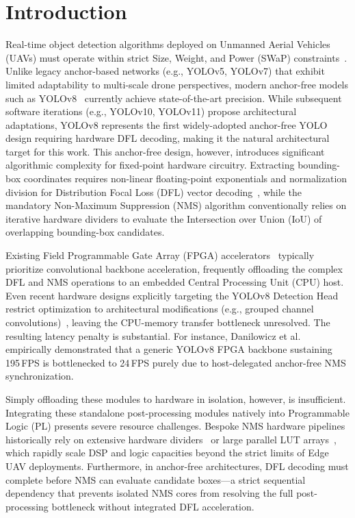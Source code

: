 \documentclass{svproc}
\begin{document}
\section{Introduction}
\label{sec:intro}

Real-time object detection algorithms deployed on Unmanned Aerial Vehicles (UAVs) must operate within strict Size, Weight, and Power (SWaP) constraints~\cite{yolo_uav2023,chakrabarty2025kiitmita,personnel_sar2025}. Unlike legacy anchor-based networks (e.g., YOLOv5, YOLOv7) that exhibit limited adaptability to multi-scale drone perspectives, modern anchor-free models such as YOLOv8~\cite{ultralytics2023yolov8} currently achieve state-of-the-art precision. While subsequent software iterations (e.g., YOLOv10, YOLOv11) propose architectural adaptations, YOLOv8 represents the first widely-adopted anchor-free YOLO design requiring hardware DFL decoding, making it the natural architectural target for this work. This anchor-free design, however, introduces significant algorithmic complexity for fixed-point hardware circuitry. Extracting bounding-box coordinates requires non-linear floating-point exponentials and normalization division for Distribution Focal Loss (DFL) vector decoding~\cite{li2020generalized}, while the mandatory Non-Maximum Suppression (NMS) algorithm conventionally relies on iterative hardware dividers to evaluate the Intersection over Union (IoU) of overlapping bounding-box candidates.

Existing Field Programmable Gate Array (FPGA) accelerators~\cite{saidani2024hardware,essel2025yolov8fpga} typically prioritize convolutional backbone acceleration, frequently offloading the complex DFL and NMS operations to an embedded Central Processing Unit (CPU) host. Even recent hardware designs explicitly targeting the YOLOv8 Detection Head restrict optimization to architectural modifications (e.g., grouped channel convolutions)~\cite{guan2024yolov8}, leaving the CPU-memory transfer bottleneck unresolved. The resulting latency penalty is substantial. For instance, Danilowicz et al.~\cite{danilowicz2025sort} empirically demonstrated that a generic YOLOv8 FPGA backbone sustaining 195\,FPS is bottlenecked to 24\,FPS purely due to host-delegated anchor-free NMS synchronization.

Simply offloading these modules to hardware in isolation, however, is insufficient. Integrating these standalone post-processing modules natively into Programmable Logic (PL) presents severe resource challenges. Bespoke NMS hardware pipelines historically rely on extensive hardware dividers~\cite{anupreetham2024nms} or large parallel LUT arrays~\cite{nguyen2021fast}, which rapidly scale DSP and logic capacities beyond the strict limits of Edge UAV deployments. Furthermore, in anchor-free architectures, DFL decoding must complete before NMS can evaluate candidate boxes---a strict sequential dependency that prevents isolated NMS cores from resolving the full post-processing bottleneck without integrated DFL acceleration.
\end{document}
